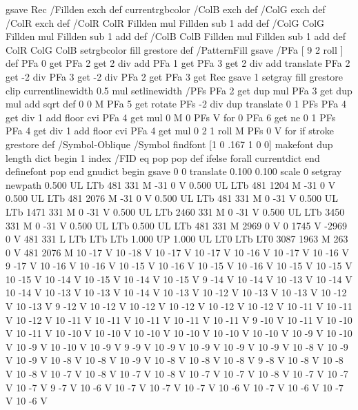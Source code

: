 {{{  gsave Rec
  /Fillden exch def
  currentrgbcolor
  /ColB exch def /ColG exch def /ColR exch def
  /ColR ColR Fillden mul Fillden sub 1 add def
  /ColG ColG Fillden mul Fillden sub 1 add def
  /ColB ColB Fillden mul Fillden sub 1 add def
  ColR ColG ColB setrgbcolor
  fill grestore } def
%
%
/PatternFill { gsave /PFa [ 9 2 roll ] def
    PFa 0 get PFa 2 get 2 div add PFa 1 get PFa 3 get 2 div add translate
    PFa 2 get -2 div PFa 3 get -2 div PFa 2 get PFa 3 get Rec
    gsave 1 setgray fill grestore clip
    currentlinewidth 0.5 mul setlinewidth
    /PFs PFa 2 get dup mul PFa 3 get dup mul add sqrt def
    0 0 M PFa 5 get rotate PFs -2 div dup translate
	0 1 PFs PFa 4 get div 1 add floor cvi
	{ PFa 4 get mul 0 M 0 PFs V } for
    0 PFa 6 get ne {
	0 1 PFs PFa 4 get div 1 add floor cvi
	{ PFa 4 get mul 0 2 1 roll M PFs 0 V } for
    } if
    stroke grestore } def
%
/Symbol-Oblique /Symbol findfont [1 0 .167 1 0 0] makefont
dup length dict begin {1 index /FID eq {pop pop} {def} ifelse} forall
currentdict end definefont pop
end
gnudict begin
gsave
0 0 translate
0.100 0.100 scale
0 setgray
newpath
0.500 UL
LTb
481 331 M
-31 0 V
0.500 UL
LTb
481 1204 M
-31 0 V
0.500 UL
LTb
481 2076 M
-31 0 V
0.500 UL
LTb
481 331 M
0 -31 V
0.500 UL
LTb
1471 331 M
0 -31 V
0.500 UL
LTb
2460 331 M
0 -31 V
0.500 UL
LTb
3450 331 M
0 -31 V
0.500 UL
LTb
0.500 UL
LTb
481 331 M
2969 0 V
0 1745 V
-2969 0 V
481 331 L
LTb
LTb
LTb
1.000 UP
1.000 UL
LT0
LTb
LT0
3087 1963 M
263 0 V
481 2076 M
10 -17 V
10 -18 V
10 -17 V
10 -17 V
10 -16 V
10 -17 V
10 -16 V
9 -17 V
10 -16 V
10 -16 V
10 -15 V
10 -16 V
10 -15 V
10 -16 V
10 -15 V
10 -15 V
10 -15 V
10 -14 V
10 -15 V
10 -14 V
10 -15 V
9 -14 V
10 -14 V
10 -13 V
10 -14 V
10 -14 V
10 -13 V
10 -13 V
10 -14 V
10 -13 V
10 -12 V
10 -13 V
10 -13 V
10 -12 V
10 -13 V
9 -12 V
10 -12 V
10 -12 V
10 -12 V
10 -12 V
10 -12 V
10 -11 V
10 -11 V
10 -12 V
10 -11 V
10 -11 V
10 -11 V
10 -11 V
10 -11 V
9 -10 V
10 -11 V
10 -10 V
10 -11 V
10 -10 V
10 -10 V
10 -10 V
10 -10 V
10 -10 V
10 -10 V
10 -9 V
10 -10 V
10 -9 V
10 -10 V
10 -9 V
9 -9 V
10 -9 V
10 -9 V
10 -9 V
10 -9 V
10 -8 V
10 -9 V
10 -9 V
10 -8 V
10 -8 V
10 -9 V
10 -8 V
10 -8 V
10 -8 V
9 -8 V
10 -8 V
10 -8 V
10 -8 V
10 -7 V
10 -8 V
10 -7 V
10 -8 V
10 -7 V
10 -7 V
10 -8 V
10 -7 V
10 -7 V
10 -7 V
9 -7 V
10 -6 V
10 -7 V
10 -7 V
10 -7 V
10 -6 V
10 -7 V
10 -6 V
10 -7 V
10 -6 V
}}
